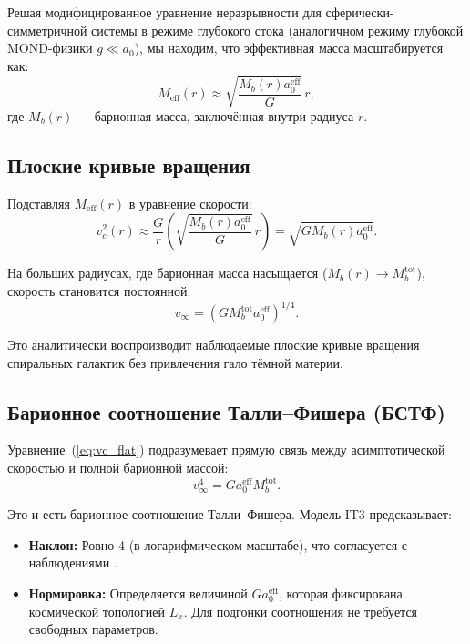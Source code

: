 \documentclass[12pt,a4paper]{article}
\begin{document}
Решая модифицированное уравнение неразрывности для сферически-симметричной системы в режиме глубокого стока (аналогичном режиму глубокой MOND-физики $g \ll a_0$), мы находим, что эффективная масса масштабируется как:
\begin{equation}
M_{\mathrm{eff}}(r) \approx \sqrt{\frac{M_b(r) a_0^{\mathrm{eff}}}{G}} \, r,
\end{equation}
где $M_b(r)$ — барионная масса, заключённая внутри радиуса $r$.

\subsection{Плоские кривые вращения}

Подставляя $M_{\mathrm{eff}}(r)$ в уравнение скорости:
\begin{equation}
v_c^2(r) \approx \frac{G}{r} \left( \sqrt{\frac{M_b(r) a_0^{\mathrm{eff}}}{G}} \, r \right) = \sqrt{G M_b(r) a_0^{\mathrm{eff}}}.
\label{eq:vc_flat}
\end{equation}

На больших радиусах, где барионная масса насыщается ($M_b(r) \to M_b^{\mathrm{tot}}$), скорость становится постоянной:
\begin{equation}
v_{\infty} = \left(G M_b^{\mathrm{tot}} a_0^{\mathrm{eff}}\right)^{1/4}.
\end{equation}

Это аналитически воспроизводит наблюдаемые плоские кривые вращения спиральных галактик без привлечения гало тёмной материи.

\subsection{Барионное соотношение Талли–Фишера (БСТФ)}

Уравнение~(\ref{eq:vc_flat}) подразумевает прямую связь между асимптотической скоростью и полной барионной массой:
\begin{equation}
v_{\infty}^4 = G a_0^{\mathrm{eff}} M_b^{\mathrm{tot}}.
\label{eq:btfr}
\end{equation}

Это и есть барионное соотношение Талли–Фишера. Модель IT3 предсказывает:
\begin{itemize}
    \item \textbf{Наклон:} Ровно 4 (в логарифмическом масштабе), что согласуется с наблюдениями \citep{McGaugh2012}.
    \item \textbf{Нормировка:} Определяется величиной $G a_0^{\mathrm{eff}}$, которая фиксирована космической топологией $L_x$. Для подгонки соотношения не требуется свободных параметров.
\end{itemize}
\end{document}
